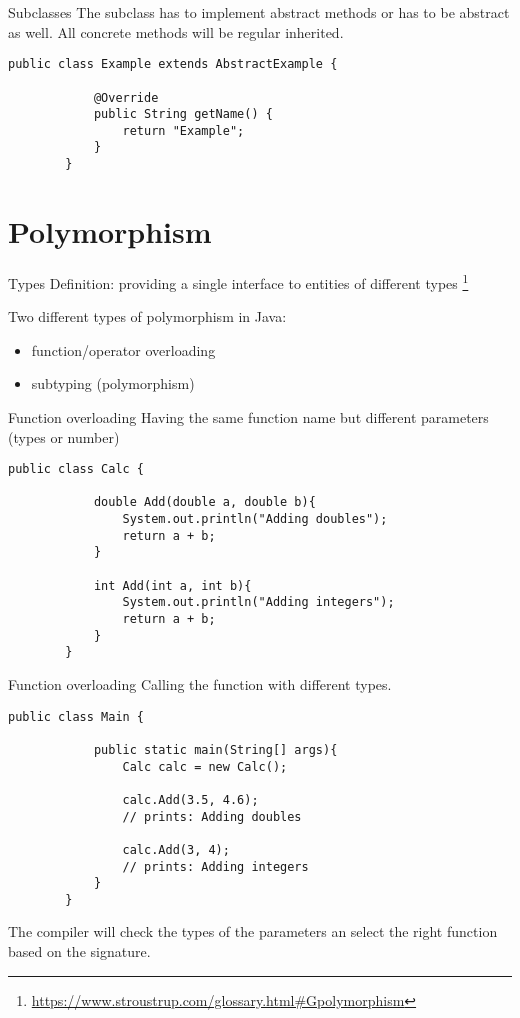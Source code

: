 \begin{frame}[fragile]{Subclasses}
	The subclass has to implement abstract methods or has to be abstract as well.
	All concrete methods will be regular inherited.
	\begin{lstlisting}[escapechar=!]
		public class Example extends AbstractExample {
			
			@Override
			public String getName() {
				return "Example";	    
			}
		}	
	\end{lstlisting}
\end{frame}

\section{Polymorphism}
\begin{frame}{Types}
	Definition: providing a single interface to entities of different types \footnote{\url{https://www.stroustrup.com/glossary.html\#Gpolymorphism}}
	
	Two different types of polymorphism in Java:
	\begin{itemize}
		\item function/operator overloading
		\item subtyping (polymorphism)
	\end{itemize}
\end{frame}

\begin{frame}[fragile]{Function overloading}
	Having the same function name but different parameters (types or number)
	\begin{lstlisting}[escapechar=!]
		public class Calc {
			
			double Add(double a, double b){
				System.out.println("Adding doubles");
				return a + b;
			}
		
			int Add(int a, int b){
				System.out.println("Adding integers");
				return a + b;
			}
		}	
	\end{lstlisting}
\end{frame}

\begin{frame}[fragile]{Function overloading}
	Calling the function with different types.
	\begin{lstlisting}[escapechar=!]
		public class Main {
			
			public static main(String[] args){
				Calc calc = new Calc();
				
				calc.Add(3.5, 4.6);
				// prints: Adding doubles
				
				calc.Add(3, 4);
				// prints: Adding integers
			}
		}	
	\end{lstlisting}
	The compiler will check the types of the parameters an select the right function based on the signature.
\end{frame}

